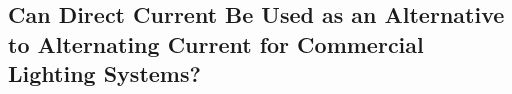 \subsection{Can Direct Current Be Used as an Alternative to Alternating Current for Commercial Lighting Systems?}
